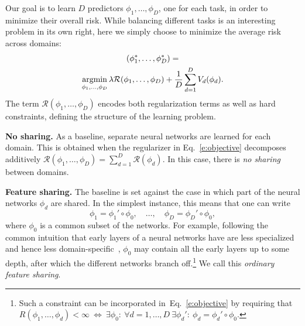 \documentclass[10pt,twocolumn,letterpaper]{article}
\newcommand{\argmin}{\operatornamewithlimits{argmin}}
\renewcommand{\paragraph}[1]{\par\medskip\noindent\textbf{#1}}
\begin{document}
Our goal is to learn $D$ predictors $\phi_1,\dots,\phi_D$, one for each task, in order to minimize their overall risk. While balancing different tasks is an interesting problem in its own right, here we simply choose to minimize the average risk across domains:
\begin{multline}\label{e:objective}
(\phi_1^*,\dots,\phi_D^*)
=\\
\argmin_{\phi_1,\dots,\phi_D}
\lambda \mathcal{R}(\phi_1,\dots,\phi_D)
+ \frac{1}{D} \sum_{d=1}^{D} V_d(\phi_d).
\end{multline}
The term $\mathcal{R}(\phi_1,\dots,\phi_D)$ encodes both regularization terms as well as hard constraints, defining the structure of the learning problem.

\paragraph{No sharing.} As a baseline, separate neural networks are learned for each domain. This is obtained when the regularizer in Eq.~\ref{e:objective} decomposes additively $\mathcal{R}(\phi_1,\dots,\phi_D) = \sum_{d=1}^D \mathcal{R}(\phi_d)$. In this case, there is \emph{no sharing} between domains.

\paragraph{Feature sharing.} The baseline is set against the case in which part of the neural networks $\phi_d$ are shared. In the simplest instance, this means that one can write
\[
   \phi_1 = \phi_1'\circ\phi_0,
   \quad\dots,
   \quad\phi_D = \phi_D'\circ\phi_0,
\]
where $\phi_0$ is a common subset of the networks. For example, following the common intuition that early layers of a neural networks have are less specialized and hence less domain-specific~\cite{cimpoi14deep}, $\phi_0$ may contain all the early layers up to some depth, after which the different networks branch off.\footnote{Such a constraint can be incorporated in~Eq.~\ref{e:objective} by requiring that $R(\phi_1,\dots,\phi_d) < \infty~\Leftrightarrow~\exists \phi_0:\ \forall d=1,\dots,D\ \exists \phi_d':\ \phi_d = \phi_d'\circ \phi_0$.} We call this \emph{ordinary feature sharing}.
\end{document}
